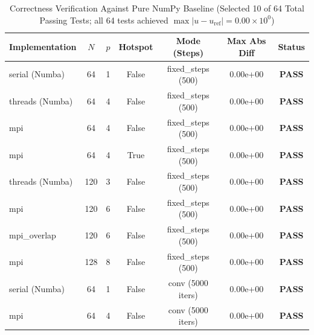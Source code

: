 \begin{table}[htbp]
\centering
\small
\caption{Correctness Verification Against Pure NumPy Baseline (Selected 10 of 64 Total Passing Tests; all 64 tests achieved $\max |u - u_{\text{ref}}| = 0.00\times 10^0$)}
\label{tab:correctness}
\begin{tabular}{lcccccc}
\hline
\textbf{Implementation} & \textbf{$N$} & \textbf{$p$} & \textbf{Hotspot} & \textbf{Mode (Steps)} & \textbf{Max Abs Diff} & \textbf{Status} \\
\hline
serial (Numba) & 64 & 1 & False & fixed\_steps (500) & 0.00e+00 & \textbf{PASS} \\
threads (Numba) & 64 & 4 & False & fixed\_steps (500) & 0.00e+00 & \textbf{PASS} \\
mpi & 64 & 4 & False & fixed\_steps (500) & 0.00e+00 & \textbf{PASS} \\
mpi & 64 & 4 & True & fixed\_steps (500) & 0.00e+00 & \textbf{PASS} \\
threads (Numba) & 120 & 3 & False & fixed\_steps (500) & 0.00e+00 & \textbf{PASS} \\
mpi & 120 & 6 & False & fixed\_steps (500) & 0.00e+00 & \textbf{PASS} \\
mpi\_overlap & 120 & 6 & False & fixed\_steps (500) & 0.00e+00 & \textbf{PASS} \\
mpi & 128 & 8 & False & fixed\_steps (500) & 0.00e+00 & \textbf{PASS} \\
serial (Numba) & 64 & 1 & False & conv (5000 iters) & 0.00e+00 & \textbf{PASS} \\
mpi & 64 & 4 & False & conv (5000 iters) & 0.00e+00 & \textbf{PASS} \\
\hline
\end{tabular}
\end{table}
